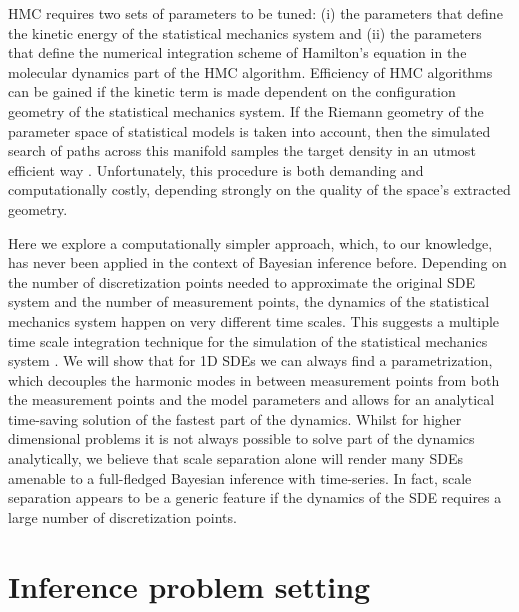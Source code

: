 \documentclass[11pt]{article}
\theoremstyle{definition}
\begin{document}
HMC requires two sets of parameters to be tuned: (i) the parameters that define the kinetic energy of the statistical mechanics system and (ii) the parameters that define the numerical integration scheme of Hamilton's equation in the molecular dynamics part of the HMC algorithm. Efficiency of HMC algorithms can be gained if the kinetic term is made dependent on the configuration geometry of the statistical mechanics system. If the Riemann geometry of the parameter space of statistical models is taken into account, then the simulated search of paths across this manifold samples the target density in an utmost efficient way
    \cite{girolami_2011_HMC}. Unfortunately, this procedure is both demanding and computationally costly,  depending strongly on the quality of the space's extracted geometry.



Here we
explore a computationally simpler approach, which, to our knowledge, has never been applied in the context of Bayesian inference before.
Depending on the number of discretization points needed to approximate the original SDE system and the number of measurement points, the dynamics of the statistical mechanics system happen on very different time scales. This suggests a multiple time scale integration technique for the simulation of the statistical mechanics system \cite{tuckerman_1993}.
We will show that for 1D SDEs we can always find a parametrization, which decouples the harmonic modes in between measurement points from both the measurement points and the model parameters and allows for an analytical time-saving solution of the fastest part of the dynamics.
Whilst for higher dimensional problems it is not always possible to solve part of the dynamics analytically, we believe that scale separation alone will render many SDEs amenable to a full-fledged Bayesian inference with time-series.
In fact, scale separation appears to be a generic feature if the dynamics of the SDE requires a large number of discretization points.

\section{Inference problem setting}
\end{document}
